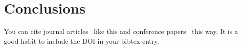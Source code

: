\chapter{Conclusions}
\label{chap:conclusion}
You can cite journal articles~\cite{lamport:tc:1979} like this and conference papers~\cite{gray:vldb:1975} this way. It is a good habit to include the DOI in your bibtex entry.